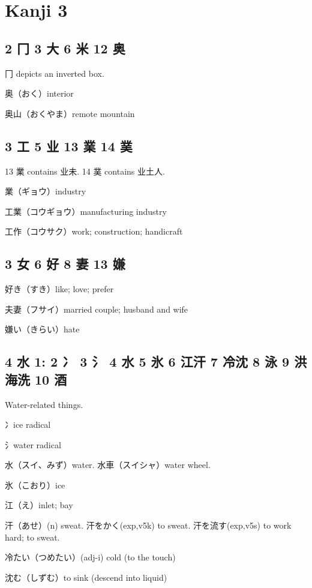\chapter{Kanji 3}

\section{2 冂 3 大 6 米 12 奥}

冂 depicts an inverted box.

奥（おく）interior

奥山（おくやま）remote mountain

\section{3 工 5 业 13 業 14 菐}

13 業 contains 业未.
14 菐 contains 业土人.

業（ギョウ）industry

工業（コウギョウ）manufacturing industry

工作（コウサク）work; construction; handicraft

\section{3 女 6 好 8 妻 13 嫌}

好き（すき）like; love; prefer

夫妻（フサイ）married couple; husband and wife

嫌い（きらい）hate

\section{4 水 1: 2 冫 3 氵 4 水 5 氷 6 江汗 7 冷沈 8 泳 9 洪海洗 10 酒}

Water-related things.

冫ice radical

氵water radical

水（スイ、みず）water.
水車（スイシャ）water wheel.

氷（こおり）ice

江（え）inlet; bay

汗（あせ）(n) sweat.
汗をかく(exp,v5k) to sweat.
汗を流す(exp,v5s) to work hard; to sweat.

冷たい（つめたい）(adj-i) cold (to the touch)

沈む（しずむ）to sink (descend into liquid)

